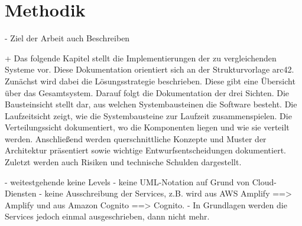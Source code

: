 \section{Methodik}

- Ziel der Arbeit auch Beschreiben


+
Das folgende Kapitel stellt die Implementierungen der zu vergleichenden Systeme vor. Diese Dokumentation orientiert sich an der Strukturvorlage arc42\autocite{starke2007strukturvorlage}. Zunächst wird dabei die Lösungsstrategie beschrieben. Diese gibt eine Übersicht über das Gesamtsystem. Darauf folgt die Dokumentation der drei Sichten. Die Bausteinsicht stellt dar, aus welchen Systembausteinen die Software besteht. Die Laufzeitsicht zeigt, wie die Systembausteine zur Laufzeit zusammenspielen. Die Verteilungssicht dokumentiert, wo die Komponenten liegen und wie sie verteilt werden. Anschließend werden querschnittliche Konzepte und Muster der Architektur präsentiert sowie wichtige Entwurfsentscheidungen dokumentiert. Zuletzt werden auch Risiken und technische Schulden dargestellt.

- weitestgehende keine Levels
- keine UML-Notation auf Grund von Cloud-Diensten
- keine Ausschreibung der Services, z.B. wird aus AWS Amplify ==> Amplify und aus Amazon Cognito ==> Cognito.
- In Grundlagen werden die Services jedoch einmal ausgeschrieben, dann nicht mehr.